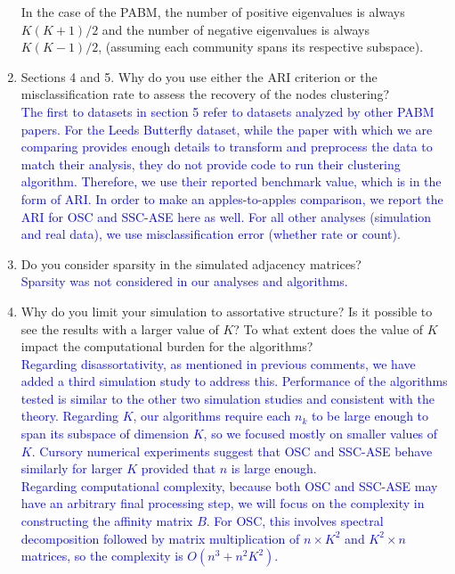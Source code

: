 \documentclass[
]{article}
\begin{document}
\begin{enumerate}
{  In the case of the PABM, the number of positive eigenvalues is always $K (K + 1) / 2$ and the number of negative eigenvalues is always $K (K - 1) / 2$, (assuming each community spans its respective subspace). 
  }
\item
  Sections 4 and 5. Why do you use either the ARI criterion or the
  misclassification rate to assess the recovery of the nodes
  clustering?\\
  \textcolor{blue}{
  The first to datasets in section 5 refer to datasets analyzed by other PABM papers. 
  For the Leeds Butterfly dataset, while the paper with which we are comparing \citep{noroozi2019estimation} provides enough details to transform and preprocess the data to match their analysis, they do not provide code to run their clustering algorithm. 
  Therefore, we use their reported benchmark value, which is in the form of ARI. 
  In order to make an apples-to-apples comparison, we report the ARI for OSC and SSC-ASE here as well. 
  For all other analyses (simulation and real data), we use misclassification error (whether rate or count). 
  }
\item
  Do you consider sparsity in the simulated adjacency matrices?\\
  \textcolor{blue}{
  Sparsity was not considered in our analyses and algorithms.
  }
\item
  Why do you limit your simulation to assortative structure? Is it
  possible to see the results with a larger value of \(K\)? To what
  extent does the value of \(K\) impact the computational burden for the
  algorithms?\\
  \textcolor{blue}{
  Regarding disassortativity, as mentioned in previous comments, we have added a third simulation study to address this. 
  Performance of the algorithms tested is similar to the other two simulation studies and consistent with the theory. 
  Regarding $K$, our algorithms require each $n_k$ to be large enough to span its subspace of dimension $K$, so we focused mostly on smaller values of $K$. 
  Cursory numerical experiments suggest that OSC and SSC-ASE behave similarly for larger $K$ provided that $n$ is large enough. 
  }\\
  \textcolor{blue}{
  Regarding computational complexity, because both OSC and SSC-ASE may have an arbitrary final processing step, we will focus on the complexity in constructing the affinity matrix $B$. 
  For OSC, this involves spectral decomposition followed by matrix multiplication of $n \times K^2$ and $K^2 \times n$ matrices, so the complexity is $O(n^3 + n^2 K^2)$. 
}
\end{enumerate}
\end{document}
